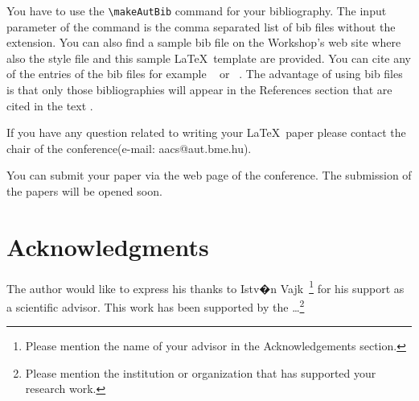 \documentclass[twoside,b5paper,10pt]{article}
\begin{document}
You have to use the \verb|\makeAutBib| command for your
bibliography. The input parameter of the command is the comma
separated list of bib files without the extension. You can also find
a sample bib file on the Workshop's web site where also the style
file and this sample \LaTeX \ template are provided. You can cite
any of the entries of the bib files for example ~\cite{ han00mining}
or ~\cite{burdick01mafia}. The advantage of using bib files is that
only those bibliographies will appear in the References section that
are cited in the text \cite{proba}.

If you have any question related to writing your \LaTeX \ paper
please contact the chair of the conference(e-mail: aacs@aut.bme.hu).

You can submit your paper via the web page of the conference. The
submission of the papers will be opened soon.

\section*{Acknowledgments}
 { \small The author would like to express his thanks to Istv�n Vajk~\footnote{Please mention the name of your advisor in the
Acknowledgements section. } for his support as a scientific advisor.
This work has been supported by the \dots \footnote{Please mention
the institution or organization that has supported your research
work.} }

\end{document}
